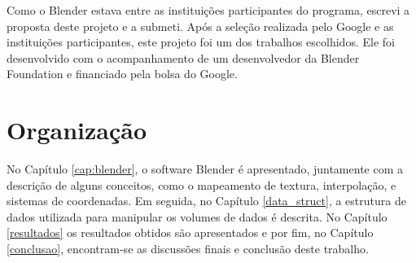 Como o Blender estava entre as instituições participantes do programa, escrevi a proposta deste projeto e a submeti. Após a seleção realizada pelo Google e as instituições participantes, este projeto foi um dos trabalhos escolhidos. Ele foi desenvolvido com o acompanhamento de um desenvolvedor da Blender Foundation e financiado pela bolsa do Google.

\section{Organizaç\~ao}

No Capítulo \ref{cap:blender}, o software Blender é apresentado, juntamente com a descrição de alguns conceitos, como o mapeamento de textura, interpolação, e sistemas de coordenadas. Em seguida, no Capítulo \ref{data_struct}, a estrutura de dados utilizada para manipular os volumes de dados é descrita. No Capítulo \ref{resultados} os resultados obtidos são apresentados e por fim, no Capítulo \ref{conclusao}, encontram-se as discussões finais e conclusão deste trabalho.

